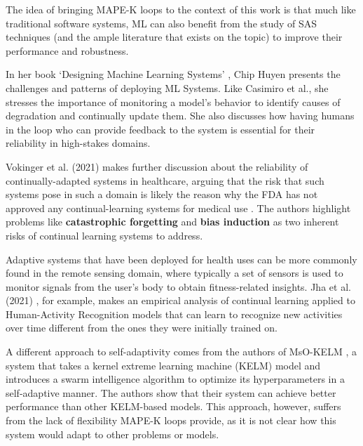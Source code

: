 \documentclass[../main.tex]{subfiles}
\begin{document}
    The idea of bringing MAPE-K loops to the context of this work is that much like traditional software systems, ML can also benefit from the study of SAS techniques (and the ample literature that exists on the topic) to improve their performance and robustness.

    In her book `Designing Machine Learning Systems' \cite{huyen_designing_2022}, Chip Huyen presents the challenges and patterns of deploying ML Systems. Like Casimiro et al., she stresses the importance of monitoring a model's behavior to identify causes of degradation and continually update them. She also discusses how having humans in the loop who can provide feedback to the system is essential for their reliability in high-stakes domains.

    Vokinger et al. (2021) makes further discussion about the reliability of continually-adapted systems in healthcare, arguing that the risk that such systems pose in such a domain is likely the reason why the FDA has not approved any continual-learning systems for medical use \cite{vokingerContinualLearningMedical2021}. The authors highlight problems like \textbf{catastrophic forgetting} and \textbf{bias induction} as two inherent risks of continual learning systems to address.

    Adaptive systems that have been deployed for health uses can be more commonly found in the remote sensing domain, where typically a set of sensors is used to monitor signals from the user's body to obtain fitness-related insights. Jha et al. (2021) \cite{jhaContinualLearningSensorbased2021}, for example, makes an empirical analysis of continual learning applied to Human-Activity Recognition models that can learn to recognize new activities over time different from the ones they were initially trained on.
    
    A different approach to self-adaptivity comes from the authors of MsO-KELM \cite{haoTechnologyOrientedPathwayAuxiliary2022}, a system that takes a kernel extreme learning machine (KELM) model \cite{xiaEvolvingKernelExtreme2022} and introduces a swarm intelligence algorithm to optimize its hyperparameters in a self-adaptive manner. The authors show that their system can achieve better performance than other KELM-based models. This approach, however, suffers from the lack of flexibility MAPE-K loops provide, as it is not clear how this system would adapt to other problems or models.
    
\end{document}
